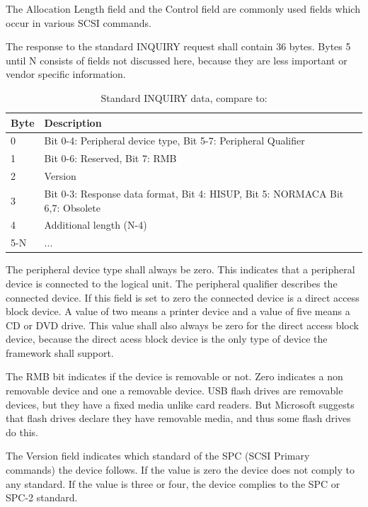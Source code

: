 The Allocation Length field and the Control field are commonly used fields which occur in various SCSI commands\cite{scsi_seagate}.

The response to the standard INQUIRY request shall contain 36 bytes\cite{scsi_seagate}. Bytes 5 until N consists of fields not discussed here, because they are less important or vendor specific information.

\begin{table}[ht]
\caption{Standard INQUIRY data, compare to: \cite{usb_ms_jan, scsi_seagate}}
\centering
\begin{tabular}{|l|l|}
\hline\hline
\textbf{Byte} & \textbf{Description}\\ \hline
0 & Bit 0-4: Peripheral device type, Bit 5-7: Peripheral Qualifier \\ \hline
1 & Bit 0-6: Reserved, Bit 7: RMB \\ \hline
2 & Version \\ \hline
3 & Bit 0-3: Response data format, Bit 4: HISUP, Bit 5: NORMACA Bit 6,7: Obsolete \\ \hline
4 & Additional length (N-4) \\ \hline
5-N & ... \\ \hline
\end{tabular}
\label{table:inquiry_data}
\end{table}

The peripheral device type shall always be zero. This indicates that a peripheral device is connected to the logical unit. The peripheral qualifier describes the connected device. If this field is set to zero the connected device is a direct access block device. A value of two means a printer device and a value of five means a CD or DVD drive\cite{usb_ms_jan, scsi_seagate}. This value shall also always be zero for the direct access block device, because the direct acess block device is the only type of device the framework shall support.

The RMB bit indicates if the device is removable or not. Zero indicates a non removable device and one a removable device. USB flash drives are removable devices, but they have a fixed media unlike card readers. But Microsoft suggests that flash drives declare they have removable media, and thus some flash drives do this\cite{usb_ms_jan}.

The Version field indicates which standard of the SPC (SCSI Primary commands) the device follows. If the value is zero the device does not comply to any standard. If the value is three or four, the device complies to the SPC or SPC-2 standard\cite{usb_ms_jan, scsi_seagate}.

